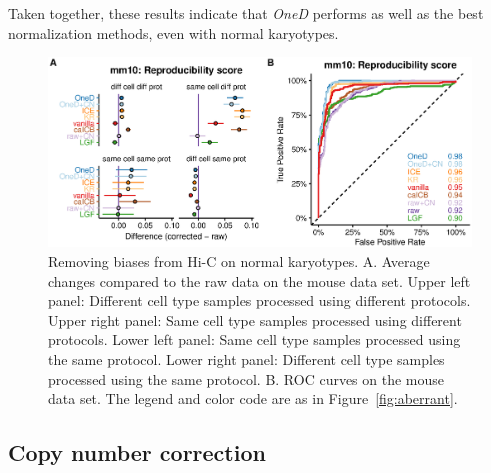 \documentclass[a4,center,fleqn]{NAR}
\providecommand{\DIFadd}[1]{{\protect\color{red}#1}} %
\providecommand{\DIFdel}[1]{{\protect}}                      %
\providecommand{\DIFaddFL}[1]{\DIFadd{#1}} %
\providecommand{\DIFdelFL}[1]{\DIFdel{#1}} %
\providecommand{\DIFaddbeginFL}{} %
\providecommand{\DIFaddendFL}{} %
\providecommand{\DIFdelbeginFL}{} %
\providecommand{\DIFdelendFL}{} %
\begin{document}
Taken together, these results indicate that \textit{OneD} performs as well
as the best normalization methods, even with normal karyotypes.

\begin{figure}
\DIFdelbeginFL %
\DIFdelendFL \centerline{\includegraphics[width=.49\textwidth]{figure_3.eps}}
 \caption{\DIFdelbeginFL \DIFdelFL{Results of the comparison between samples with }\DIFdelendFL \DIFaddbeginFL \DIFaddFL{Removing biases from Hi-C on }\DIFaddendFL normal karyotypes. A. Average
  changes compared to the raw data on the mouse data set.
  \DIFaddbeginFL \DIFaddFL{Upper left panel: Different cell type samples
processed using different protocols. Upper right panel: Same cell
type samples processed using different protocols. Lower left panel:
Same cell type samples processed using the same protocol. Lower right panel:
Different cell type samples processed using the same protocol. }\DIFaddendFL B. ROC curves on
the mouse data set. The legend \DIFdelbeginFL \DIFdelFL{is }\DIFdelendFL \DIFaddbeginFL \DIFaddFL{and color code are }\DIFaddendFL as in Figure~\ref{fig:aberrant}.}
\label{fig:normal}
\end{figure}


\subsection{Copy number correction}
\end{document}
